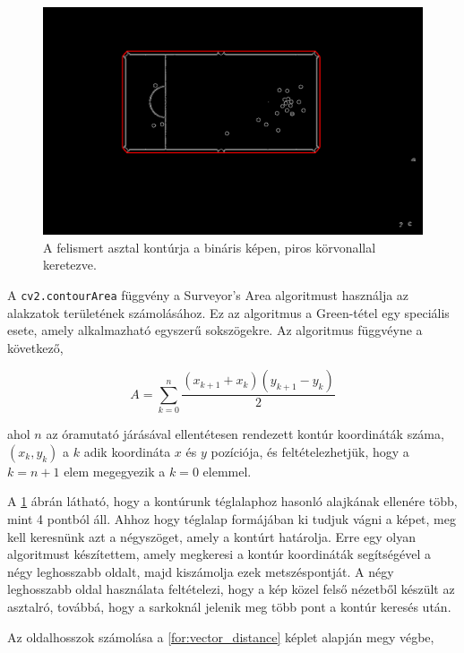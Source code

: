 \begin{figure}[!ht]
    \centering
    \includegraphics[width=150mm, keepaspectratio]{figures/input_screen_contour.png}
    \caption{A felismert asztal kontúrja a bináris képen, piros körvonallal keretezve.}
    \label{fig:bemeneti_kep_contour}
\end{figure}

\par A \lstinline{cv2.contourArea} függvény a Surveyor's Area algoritmust \cite{braden1986surveyor} használja az alakzatok területének számolásához. Ez az algoritmus a Green-tétel egy speciális esete, amely alkalmazható egyszerű sokszögekre.
\newline Az algoritmus függvéyne a következő,

\begin{equation}
    A = \sum^n_{k=0}\frac{(x_{k+1} + x_k)(y_{k+1} - y_k)}{2}
    \label{for:green_formula}
\end{equation}

\par ahol $n$ az óramutató járásával ellentétesen rendezett kontúr koordináták száma, $(x_k, y_k)$ a $k$ adik koordináta $x$ és $y$ pozíciója, és feltételezhetjük, hogy a $k = n+1$ elem megegyezik a $k = 0$ elemmel.

\par A \ref{fig:bemeneti_kep_contour} ábrán látható, hogy a kontúrunk téglalaphoz hasonló alajkának ellenére több, mint 4 pontból áll. Ahhoz hogy téglalap formájában ki tudjuk vágni a képet, meg kell keresnünk azt a négyszöget, amely a kontúrt határolja. Erre egy olyan algoritmust készítettem, amely megkeresi a kontúr koordináták segítségével a négy leghosszabb oldalt, majd kiszámolja ezek metszéspontját. A négy leghosszabb oldal használata feltételezi, hogy a kép közel felső nézetből készült az asztalró, továbbá, hogy a sarkoknál jelenik meg több pont a kontúr keresés után.
\par Az oldalhosszok számolása a \ref{for:vector_distance} képlet alapján megy végbe,

